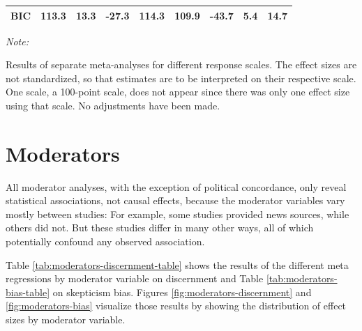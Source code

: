 \documentclass[
  man]{apa6}
\begin{document}
\begin{table}
{\begin{threeparttable}
\begin{tabular}[t]{lcccccccc}
\hspace{1em}BIC & 113.3 & 13.3 & -27.3 & 114.3 & 109.9 & -43.7 & 5.4 & 14.7\\
\bottomrule
\end{tabular}
\begin{tablenotes}
\item \textit{Note: } 
\item Results of separate meta-analyses for different response scales. The effect sizes are not standardized, so that estimates are to be interpreted on their respective scale. One scale, a 100-point scale, does not appear since there was only one effect size using that scale. No adjustments have been made.
\end{tablenotes}
\end{threeparttable}}
\end{table}

\clearpage

\section{Moderators}\label{moderators}

\FloatBarrier

All moderator analyses, with the exception of political concordance, only reveal statistical associations, not causal effects, because the moderator variables vary mostly between studies: For example, some studies provided news sources, while others did not. But these studies differ in many other ways, all of which potentially confound any observed association.

Table \ref{tab:moderators-discernment-table} shows the results of the different meta regressions by moderator variable on discernment and Table \ref{tab:moderators-bias-table} on skepticism bias. Figures \ref{fig:moderators-discernment} and \ref{fig:moderators-bias} visualize those results by showing the distribution of effect sizes by moderator variable.
\end{document}
